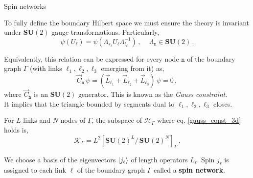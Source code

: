 \documentclass[12pt,titlepage]{article}
\begin{document}
\begin{frame}{Spin networks}
    \begin{list}{\,}{\leftmargin=1em \itemindent=0em}
        \item<1-> To fully define the boundary Hilbert space we must ensure the theory is invariant under $\mathbf{SU}(2)$ gauge transformations. Particularly,
        \begin{equation}
            \psi(U_\ell)=\psi(\Lambda_{s_\ell}U_\ell\Lambda_{t_\ell}^{-1})\,,\,\,\,\,\,\,\, \Lambda_{\mathtt{n}}\in\mathbf{SU}(2)\,.
        \end{equation}
        \item<2-> Equivalently, this relation can be expressed for every node $\mathtt{n}$ of the boundary graph $\Gamma$ (with links $\ell_1,\ell_2,\ell_3$ emerging from it) as,
        \begin{equation}\label{gauss_const_3d}
            \vec{C}_\mathtt{n}\,\psi=(\vec{L}_{\ell_1}+\vec{L}_{\ell_2}+\vec{L}_{\ell_3})\,\psi=0\,,
        \end{equation}
        where $\vec{C}_\mathtt{n}$ is an $\mathbf{SU}(2)$ generator. This is known as the \textit{Gauss constraint}.\\
        It implies that the triangle bounded by segments dual to $\ell_1,\ell_2,\ell_3$ closes.
        \item<3-> For $L$ links and $N$ nodes of $\Gamma$, the subspace of $\mathcal{H}_\Gamma$ where eq. \ref{gauss_const_3d} holds is,
        \begin{equation}
            \mathcal{K}_\Gamma=L^2[{\mathbf{SU}(2)}^L/\,{\mathbf{SU}(2)}^N]_\Gamma\,.
        \end{equation}
        \item<4-> We choose a basis of the eigenvectors $\ket{j_\ell}$ of length operators $L_\ell$. Spin $j_\ell$ is assigned to each link $\ell$ of the boundary graph $\Gamma$ called a \textbf{spin network}.
    \end{list}
\end{frame}
\end{document}
